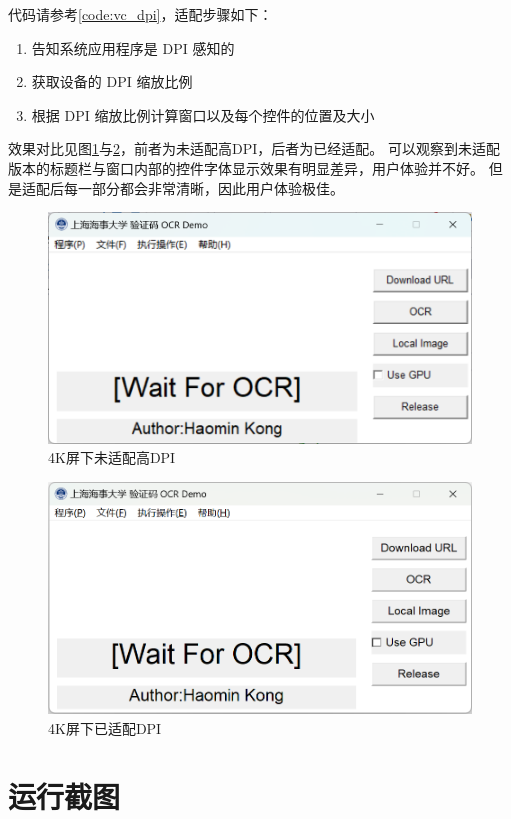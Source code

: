 代码请参考\ref{code:vc_dpi}，适配步骤如下：

\begin{enumerate}
	\item 告知系统应用程序是 DPI 感知的
	\item 获取设备的 DPI 缩放比例
	\item 根据 DPI 缩放比例计算窗口以及每个控件的位置及大小
\end{enumerate}

效果对比见图\ref{fig:dpilow}与\ref{fig:dpihigh}，前者为未适配高DPI，后者为已经适配。
可以观察到未适配版本的标题栏与窗口内部的控件字体显示效果有明显差异，用户体验并不好。
但是适配后每一部分都会非常清晰，因此用户体验极佳。

\begin{figure}
	\centering
	\includegraphics[width=0.9\linewidth]{Resources/Picture/dpi_low}
	\caption{4K屏下未适配高DPI}
	\label{fig:dpilow}
\end{figure}

\begin{figure}
	\centering
	\includegraphics[width=0.9\linewidth]{Resources/Picture/dpi_high}
	\caption{4K屏下已适配DPI}
	\label{fig:dpihigh}
\end{figure}

\section{运行截图}

